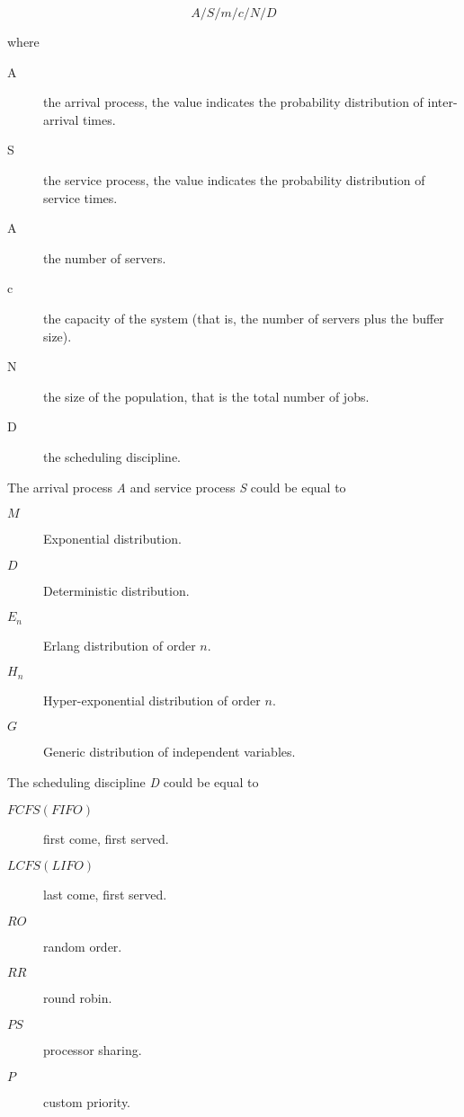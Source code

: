 \begin{equation}
A/S/m/c/N/D
\end{equation} 

where 

\begin{description}
	\item [A] the arrival process, the value indicates the probability distribution of inter-arrival times.
	
	\item [S] the service process, the value indicates the probability distribution of service times.
	
	\item [A] the number of servers.
	
	\item [c] the capacity of the system (that is, the number of servers plus the buffer size).
	
	\item [N] the size of the population, that is the total number of jobs.
	
	\item [D] the scheduling discipline.
\end{description}

The arrival process \textit{A} and service process \textit{S} could be equal to 

\begin{description}
	\item [$M$] Exponential distribution.
	
	\item [$D$] Deterministic distribution.
	
	\item [$E_{n}$] Erlang distribution of order $n$.
	
	\item [$H_{n}$] Hyper-exponential distribution of order $n$.
	
	\item [$G$] Generic distribution of independent variables.
\end{description}

The scheduling discipline \textit{D} could be equal to 

\begin{description}
	\item [$FCFS (FIFO)$] first come, first served.
	
	\item [$LCFS (LIFO)$] last come, first served.
	
	\item [$RO$] random order.
	
	\item [$RR$] round robin.
	
	\item [$PS$] processor sharing.
	
	\item [$P$] custom priority.
\end{description}

